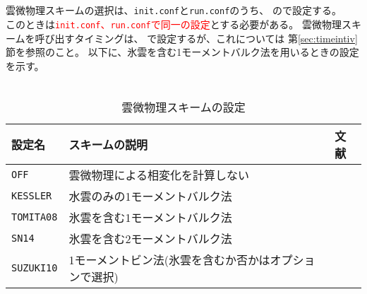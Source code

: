 \section{\SecBasicPhysicsSetting} \label{sec:basic_usel_physics}

\subsection{\SubsecMicrophysicsSetting} \label{subsec:basic_usel_microphys}
雲微物理スキームの選択は、\verb|init.conf|と\verb|run.conf|のうち、
ので設定する。\\
このときは\textcolor{red}{\texttt{init.conf}、\texttt{run.conf}で同一の設定}とする必要がある。
雲微物理スキームを呼び出すタイミングは、
で設定するが、これについては
第\ref{sec:timeintiv}節を参照のこと。
以下に、氷雲を含む1モーメントバルク法を用いるときの設定を示す。\\

\\

\begin{table}[h]
\begin{center}
  \caption{雲微物理スキームの設定}
  \label{tab:nml_atm_mp}
  \begin{tabularx}{150mm}{lXX} \hline
    \rowcolor[gray]{0.9}  設定名 & スキームの説明 & 文献\\ \hline
     \verb|OFF|      & 雲微物理による相変化を計算しない &  \\
     \verb|KESSLER|  & 水雲のみの1モーメントバルク法 & \citet{kessler_1969} \\
     \verb|TOMITA08| & 氷雲を含む1モーメントバルク法 & \citet{tomita_2008} \\
     \verb|SN14|     & 氷雲を含む2モーメントバルク法 & \citet{sn_2014} \\
     \verb|SUZUKI10| & 1モーメントビン法(氷雲を含むか否かはオプションで選択) & \citet{suzuki_etal_2010} \\
    \hline
  \end{tabularx}
\end{center}
\end{table}

